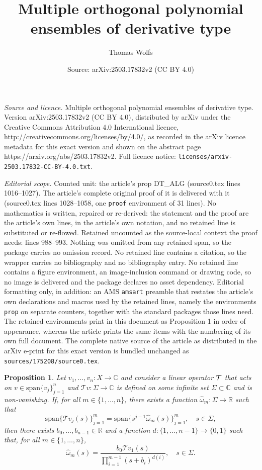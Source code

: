 \documentclass[10pt,a4paper]{amsart}
\title{Multiple orthogonal polynomial ensembles of derivative type}
\author{Thomas Wolfs}
\date{Source: arXiv:2503.17832v2 (CC BY 4.0)}
\newtheorem{prop}{Proposition}
\newcommand{\C}{\mathbb{C}}
\newcommand{\R}{\mathbb{R}}
\newcommand{\T}[1]{\mathcal{T}#1}
\newcommand{\om}{\omega}
\newcommand{\spn}[1]{\text{span}\{#1\}}
\begin{document}
\maketitle

\noindent\emph{Source and licence.} Multiple orthogonal polynomial ensembles of derivative type. Version arXiv:2503.17832v2 (CC BY 4.0), distributed by arXiv under the Creative Commons Attribution 4.0 International licence, http://creativecommons.org/licenses/by/4.0/, as recorded in the arXiv licence metadata for this exact version and shown on the abstract page https://arxiv.org/abs/2503.17832v2. Full licence notice: \texttt{licenses/arxiv-2503.17832-CC-BY-4.0.txt}.\par\smallskip

\noindent\textit{Editorial scope.} Counted unit: the article's prop DT\_ALG (source0.tex lines 1016--1027). The article's complete original proof of it is delivered with it (source0.tex lines 1028--1058, one \texttt{proof} environment of 31 lines). No mathematics is written, repaired or re-derived: the statement and the proof are the article's own lines, in the article's own notation, and no retained line is substituted or re-flowed.  Retained uncounted as the source-local context the proof needs: lines 988--993.  Nothing was omitted from any retained span, so the package carries no omission record.  No retained line contains a citation, so the wrapper carries no bibliography and no bibliography entry.  No retained line contains a figure environment, an image-inclusion command or drawing code, so no image is delivered and the package declares no asset dependency.  Editorial formatting only, in addition: an AMS \texttt{amsart} preamble that restates the article's own declarations and macros used by the retained lines, namely the environments \texttt{prop} on separate counters, together with the standard packages those lines need.  The retained environments print in this document as Proposition 1 in order of appearance, whereas the article prints the same items with the numbering of its own full document.  The complete native source of the article as distributed in the arXiv e-print for this exact version is bundled unchanged as \texttt{sources/175208/source0.tex}.
\begin{prop} \label{DT_ALG_FUN}
    Let $v_1,\dots,v_n:X\to\C$ and consider a linear operator $\T$ that acts on $v\in \spn{v_j}_{j=1}^n$ and $\T{v}:\Sigma\to\C$ is defined on some infinite set $\Sigma\subset\C$ and is non-vanishing. If, for all $m\in\{1,\dots,n\}$, there exists a function $\hat{\om}_m:\Sigma\to\R$ such that
        $$\spn{\T{v_j}(s)}_{j=1}^{m} = \spn{ s^{j-1} \hat{\om}_m(s)}_{j=1}^{m},\quad s\in\Sigma,$$
    then there exists $b_0,\dots,b_{n-1}\in\R$ and a function $d:\{1,\dots,n-1\}\to\{0,1\}$ such that, for all $m\in\{1,\dots,n\}$,
    $$ \hat{\om}_m(s) = \frac{b_0 \T{v_1}(s)}{\prod_{i=1}^{m-1} (s+b_i)^{d(i)}},\quad s\in\Sigma.$$
\end{prop}
\end{document}
